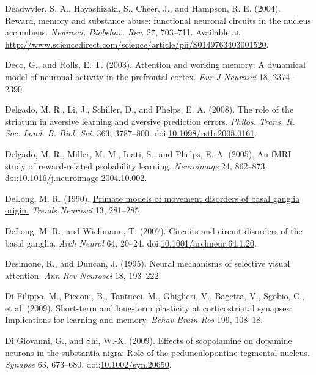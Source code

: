 \documentclass[
  11pt,
  a4paper,
]{scrbook}
\newlength{\cslhangindent}
\newenvironment{CSLReferences}[2] %
 {\begin{list}{}{%
  \setlength{\itemindent}{0pt}
  \setlength{\leftmargin}{0pt}
  \setlength{\parsep}{0pt}
  \ifodd #1
   \setlength{\leftmargin}{\cslhangindent}
   \setlength{\itemindent}{-1\cslhangindent}
  \fi
  \setlength{\itemsep}{#2\baselineskip}}}
 {\end{list}}
\begin{document}
\begin{CSLReferences}{1}{1}
Deadwyler, S. A., Hayashizaki, S., Cheer, J., and Hampson, R. E. (2004).
{Reward, memory and substance abuse: functional neuronal circuits in the
nucleus accumbens}. \emph{Neurosci. Biobehav. Rev.} 27, 703--711.
Available at:
\url{http://www.sciencedirect.com/science/article/pii/S0149763403001520}.

Deco, G., and Rolls, E. T. (2003). Attention and working memory: A
dynamical model of neuronal activity in the prefrontal cortex. \emph{Eur
J Neurosci} 18, 2374--2390.

Delgado, M. R., Li, J., Schiller, D., and Phelps, E. A. (2008). {The
role of the striatum in aversive learning and aversive prediction
errors.} \emph{Philos. Trans. R. Soc. Lond. B. Biol. Sci.} 363,
3787--800.
doi:\href{https://doi.org/10.1098/rstb.2008.0161}{10.1098/rstb.2008.0161}.

Delgado, M. R., Miller, M. M., Inati, S., and Phelps, E. A. (2005). An
fMRI study of reward-related probability learning. \emph{Neuroimage} 24,
862--873.
doi:\href{https://doi.org/10.1016/j.neuroimage.2004.10.002}{10.1016/j.neuroimage.2004.10.002}.

DeLong, M. R. (1990).
\href{https://www.ncbi.nlm.nih.gov/pubmed/1695404}{Primate models of
movement disorders of basal ganglia origin.} \emph{Trends Neurosci} 13,
281--285.

DeLong, M. R., and Wichmann, T. (2007). Circuits and circuit disorders
of the basal ganglia. \emph{Arch Neurol} 64, 20--24.
doi:\href{https://doi.org/10.1001/archneur.64.1.20}{10.1001/archneur.64.1.20}.

Desimone, R., and Duncan, J. (1995). Neural mechanisms of selective
visual attention. \emph{Ann Rev Neurosci} 18, 193--222.

Di Filippo, M., Picconi, B., Tantucci, M., Ghiglieri, V., Bagetta, V.,
Sgobio, C., et al. (2009). Short-term and long-term plasticity at
corticostriatal synapses: Implications for learning and memory.
\emph{Behav Brain Res} 199, 108--18.

Di Giovanni, G., and Shi, W.-X. (2009). Effects of scopolamine on
dopamine neurons in the substantia nigra: Role of the pedunculopontine
tegmental nucleus. \emph{Synapse} 63, 673--680.
doi:\href{https://doi.org/10.1002/syn.20650}{10.1002/syn.20650}.


\end{CSLReferences}
\end{document}
